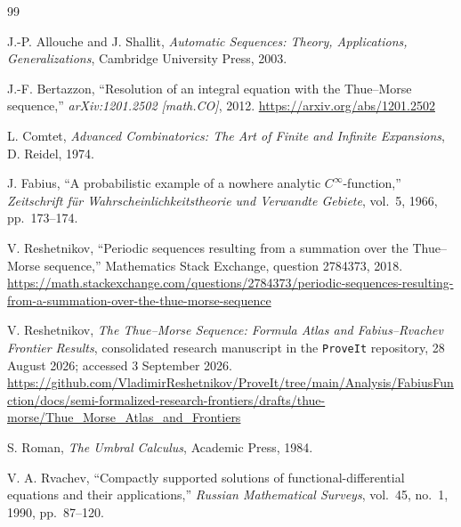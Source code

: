 \documentclass[11pt,oneside]{article}
\numberwithin{equation}{section}
\theoremstyle{definition}
\theoremstyle{remark}
\begin{document}
\clearpage
\begin{thebibliography}{99}

J.-P. Allouche and J. Shallit,
\emph{Automatic Sequences: Theory, Applications, Generalizations},
Cambridge University Press, 2003.

J.-F. Bertazzon,
``Resolution of an integral equation with the Thue--Morse sequence,''
\emph{arXiv:1201.2502 [math.CO]}, 2012.
\url{https://arxiv.org/abs/1201.2502}

L. Comtet,
\emph{Advanced Combinatorics: The Art of Finite and Infinite Expansions},
D. Reidel, 1974.

J. Fabius,
``A probabilistic example of a nowhere analytic \(C^\infty\)-function,''
\emph{Zeitschrift f\"ur Wahrscheinlichkeitstheorie und Verwandte Gebiete},
vol.~5, 1966, pp.~173--174.

V. Reshetnikov,
``Periodic sequences resulting from a summation over the Thue--Morse
sequence,'' Mathematics Stack Exchange, question 2784373, 2018.
\url{https://math.stackexchange.com/questions/2784373/periodic-sequences-resulting-from-a-summation-over-the-thue-morse-sequence}

V. Reshetnikov,
\emph{The Thue--Morse Sequence: Formula Atlas and Fabius--Rvachev Frontier
Results}, consolidated research manuscript in the \texttt{ProveIt}
repository, 28 August 2026; accessed 3 September 2026.
\url{https://github.com/VladimirReshetnikov/ProveIt/tree/main/Analysis/FabiusFunction/docs/semi-formalized-research-frontiers/drafts/thue-morse/Thue_Morse_Atlas_and_Frontiers}

S. Roman,
\emph{The Umbral Calculus},
Academic Press, 1984.

V. A. Rvachev,
``Compactly supported solutions of functional-differential equations and
their applications,''
\emph{Russian Mathematical Surveys}, vol.~45, no.~1, 1990, pp.~87--120.

\end{thebibliography}
\end{document}
